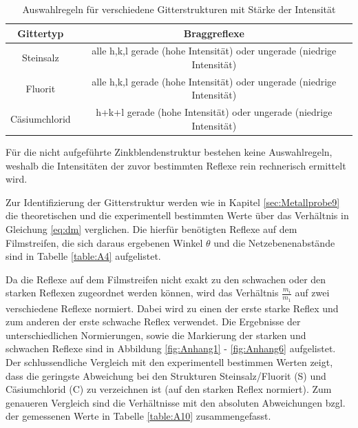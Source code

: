    \begin{table}
     \centering
     \caption{Auswahlregeln für verschiedene Gitterstrukturen mit Stärke der Intensität}
     \label{tbl:beispieltabelle}
     \begin{tabular}{cc}
       \hline
       \textbf{Gittertyp}  & \textbf{Braggreflexe} \\
       \hline
       Steinsalz           & alle h,k,l gerade (hohe Intensität) oder ungerade (niedrige Intensität)             \\
       Fluorit             & alle h,k,l gerade (hohe Intensität) oder ungerade (niedrige Intensität)              \\
       Cäsiumchlorid       & h\:+\:k\:+\:l gerade (hohe Intensität) oder ungerade (niedrige Intensität)              \\
     \end{tabular}



   \end{table}

Für die nicht aufgeführte Zinkblendenstruktur bestehen keine Auswahlregeln, weshalb die Intensitäten der zuvor bestimmten Reflexe rein rechnerisch ermittelt wird.




Zur Identifizierung der Gitterstruktur werden wie in Kapitel \ref{sec:Metallprobe9} die theoretischen und die experimentell bestimmten Werte über das Verhältnis in Gleichung \ref{eq:dm} verglichen. Die hierfür benötigten Reflexe auf dem Filmstreifen, die sich daraus ergebenen Winkel $\theta$ und die Netzebenenabstände sind in Tabelle \ref{table:A4} aufgelistet.



Da die Reflexe auf dem Filmstreifen nicht exakt zu den schwachen oder den starken Reflexen zugeordnet werden können, wird das Verhältnis $\frac{m_i}{m_1}$ auf zwei verschiedene Reflexe normiert. Dabei wird zu einen der erste starke Reflex und zum anderen der erste schwache Reflex verwendet. Die Ergebnisse der unterschiedlichen Normierungen, sowie die Markierung der starken und schwachen Reflexe sind in Abbildung \ref{fig:Anhang1} - \ref{fig:Anhang6} aufgelistet. Der schlussendliche Vergleich mit den experimentell bestimmen Werten zeigt, dass die geringste Abweichung bei den Strukturen Steinsalz/Fluorit (S) und Cäsiumchlorid (C) zu verzeichnen ist (auf den starken Reflex normiert). Zum genaueren Vergleich sind die Verhältnisse mit den absoluten Abweichungen bzgl. der gemessenen Werte in Tabelle \ref{table:A10} zusammengefasst.

